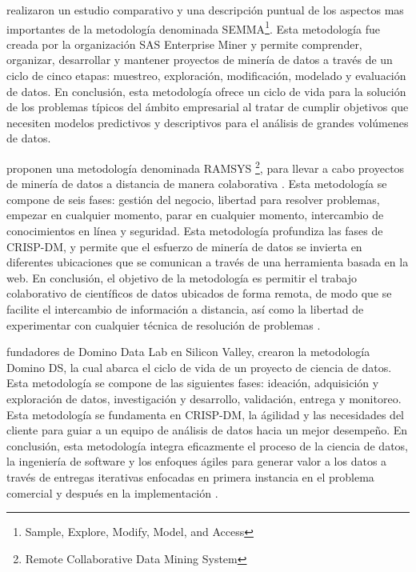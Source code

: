 \citep{Shafique2014} realizaron un estudio comparativo y una descripción puntual de los aspectos mas importantes  de la metodología denominada SEMMA\footnote{Sample, Explore, Modify, Model, and Access}. Esta metodología fue creada por la organización SAS Enterprise Miner y permite comprender, organizar, desarrollar y mantener proyectos de minería de datos a través de un ciclo de cinco etapas: muestreo, exploración, modificación, modelado y evaluación de datos.  En conclusión, esta metodología ofrece un ciclo de vida para la solución de los problemas típicos del ámbito empresarial al tratar de cumplir objetivos que necesiten modelos predictivos y descriptivos para el análisis de grandes volúmenes de datos.

\cite{Mladenic2012} proponen una metodología denominada RAMSYS \footnote{Remote Collaborative Data Mining System}, para llevar a cabo proyectos de minería de datos a distancia de manera colaborativa . Esta metodología se compone de seis fases: gestión del negocio,  libertad para resolver problemas, empezar en cualquier momento, parar en cualquier momento, intercambio de conocimientos en línea y seguridad. Esta metodología profundiza las fases de CRISP-DM, y permite que el esfuerzo de minería de datos se invierta en diferentes ubicaciones que se comunican a través de una herramienta basada en la web. En conclusión, el objetivo de la metodología es permitir el trabajo colaborativo de científicos de datos ubicados de forma remota, de modo que se facilite el intercambio de información a distancia, así como la libertad de experimentar con cualquier técnica de resolución de problemas \cite{Martinez2021}.

\citep{Elprin2022} fundadores de Domino Data Lab en Silicon Valley, crearon la metodología Domino DS, la cual abarca el ciclo de vida de un proyecto de ciencia de datos. Esta metodología se compone de las siguientes fases: ideación, adquisición y exploración de datos, investigación y desarrollo, validación, entrega y monitoreo. Esta metodología se fundamenta en CRISP-DM, la ágilidad y las necesidades del cliente para guiar a un equipo de análisis de datos hacia un mejor desempeño. En conclusión, esta metodología integra eficazmente el proceso de la ciencia de datos, la ingeniería de software y los enfoques ágiles para generar valor a los datos a través de entregas iterativas enfocadas en primera instancia en el problema comercial y después en la implementación  \citep{Martinez2021}.

